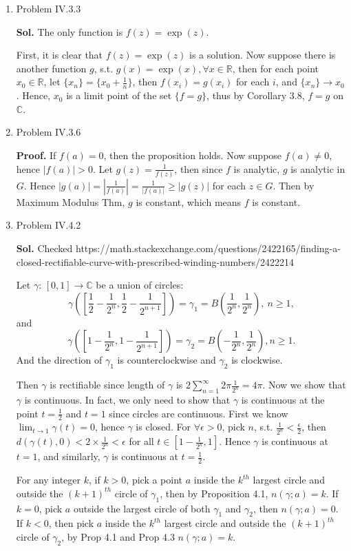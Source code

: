 \documentclass{article}%
\begin{document}
\begin{enumerate}
\item Problem IV.3.3

\textbf{Sol.}
The only function is $f(z) = \exp(z)$. 

First, it is clear that $f(z) = \exp(z)$ is a solution. Now suppose there is another function $g$, s.t. $g(x) = \exp(x), \forall x\in\mathbb{R}$, then for each point $x_0\in\mathbb{R} $, let $\{x_n\} = \{x_0 + \frac{1}{n}\}$, then $f(x_i) = g(x_i)$ for each $i$, and $\{x_n\}\to x_0 $. Hence, $x_0 $ is a limit point of the set $\{f = g\}$, thus by Corollary 3.8, $f = g$ on $\mathbb{C}$.

\item Problem IV.3.6

\textbf{Proof.} If $f(a) = 0$, then the proposition holds. Now suppose $f(a) \ne 0$, hence $|f(a)| > 0$. Let $g(z) = \frac{1}{f(z)}$, then since $f$ is analytic, $g$ is analytic in $G$. Hence $|g(a)| = \left|\frac{1}{f(a)}\right| = \frac{1}{|f(a)|} \ge |g(z)|$ for each $z\in G$. Then by Maximum Modulus Thm, $g$ is constant, which means $f$ is constant.

\item Problem IV.4.2

\textbf{Sol.} Checked https://math.stackexchange.com/questions/2422165/finding-a-closed-rectifiable-curve-with-prescribed-winding-numbers/2422214

Let $\gamma$: $[0, 1] \to \mathbb{C}$ be a union of circles:
$$
\gamma([\frac{1}{2}-\frac{1}{2^n}, \frac{1}{2}-\frac{1}{2^{n+1}}]) = \gamma_1 = B(\frac{1}{2^n}, \frac{1}{2^n}), ~n\ge 1,
$$
and
$$
\gamma([1-\frac{1}{2^n}, 1-\frac{1}{2^{n+1}}]) = \gamma_2 = B(-\frac{1}{2^n}, \frac{1}{2^n}), n \ge 1.
$$
And the direction of $\gamma_1 $ is counterclockwise and $\gamma_2 $ is clockwise.

Then $\gamma$ is rectifiable since length of $\gamma$ is $2\sum_{n=1}^{\infty}2\pi\frac{1}{2^n} = 4\pi$.
Now we show that $\gamma$ is continuous. In fact, we only need to show that $\gamma$ is continuous at the point $t = \frac{1}{2}$ and $t = 1$ since circles are continuous. First we know $\lim_{t\to 1}\gamma(t) = 0 $, hence $\gamma $ is closed. For $\forall \epsilon > 0$, pick $n$, s.t. $\frac{1}{2^n} < \frac{\epsilon}{2}$, then $d(\gamma(t), 0) < 2\times\frac{1}{2^n} < \epsilon$ for all $t\in [1-\frac{1}{2^n}, 1]$. Hence $\gamma$ is continuous at $t = 1$, and similarly, $\gamma$ is continuous at $t = \frac{1}{2}$.

For any integer $k$, if $k > 0$, pick a point $a$ inside the $k^{th} $ largest circle and outside the $(k+1)^{th} $ circle of $\gamma_1 $, then by Proposition 4.1, $n(\gamma; a) = k$. If $k = 0$, pick $a$ outside the largest circle of both $\gamma_1 $ and $\gamma_2 $, then $n(\gamma; a) = 0$.
 If $k < 0$, then pick $a$ inside the $k^{th} $ largest circle and outside the $(k+1)^{th} $ circle of $\gamma_2 $, by Prop 4.1 and Prop 4.3 $n(\gamma; a) = k$.


\end{enumerate}
\end{document}

